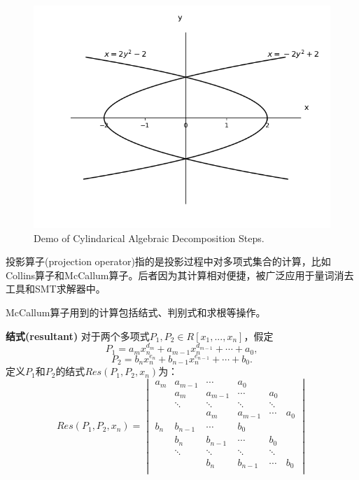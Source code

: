 \begin{figure}[t]
    \centering
    \includegraphics[width=\columnwidth]{Img/cad.png}
     {Demo of Cylindarical Algebraic Decomposition Steps.}
\label{fig:CAD}
\end{figure}
投影算子(projection operator)指的是投影过程中对多项式集合的计算，比如Collins算子\cite{Collins74}和McCallum算子\cite{McCallum98}。后者因为其计算相对便捷，被广泛应用于量词消去工具和SMT求解器中。

McCallum算子用到的计算包括结式、判别式和求根等操作。
\begin{definition}{\textbf{结式(resultant)}}
对于两个多项式$P_1, P_2 \in R[x_1, ..., x_n]$，假定$$
P_1 = a_m x_n^{d_m} + a_{m-1} x_n^{d_{m-1}} + \cdots + a_0,
$$
$$
P_2 = b_n x_n^{e_n} + b_{n-1} x_n^{e_{n-1}} + \cdots + b_0.
$$
定义$P_1$和$P_2$的结式$Res(P_1, P_2, x_n)$为：
$$
Res(P_1, P_2, x_n) = 
\begin{vmatrix}
    a_m & a_{m-1} & \cdots & a_0 \\
    & a_m & a_{m-1} & \cdots & a_0 \\
    & \ddots & \ddots & \ddots & \ddots & \\
    & & a_m & a_{m-1} & \cdots & a_0 \\

    b_n & b_{n-1} & \cdots & b_0 \\
    & b_n & b_{n-1} & \cdots & b_0 \\
    & \ddots & \ddots & \ddots & \ddots & \\
    & & b_n & b_{n-1} & \cdots & b_0 \\
    \end{vmatrix}
$$
\end{definition}

